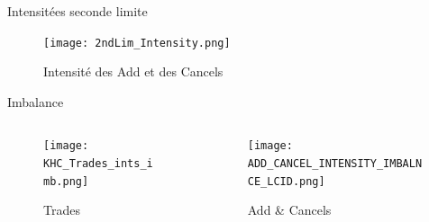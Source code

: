 \documentclass[aspectratio=169]{beamer}  %
\begin{document}
\begin{frame}{Intensitées seconde limite}
            \begin{figure}
                \centering
                \texttt{[image: 2ndLim\_Intensity.png]}
                \caption{Intensité des Add et des Cancels}
            \end{figure}

\end{frame}

\begin{frame}{Imbalance}
    \begin{columns}
        \begin{column}{0.48\textwidth}
            \begin{figure}
                \centering
                \texttt{[image: KHC\_Trades\_ints\_imb.png]}
                \caption{Trades}
            \end{figure}
        \end{column}
        \begin{column}{0.48\textwidth}
            \begin{figure}
                \centering
                \texttt{[image: ADD\_CANCEL\_INTENSITY\_IMBALNCE\_LCID.png]}
                \caption{Add \& Cancels}
            \end{figure}
        \end{column}
    \end{columns}
\end{frame}
\end{document}
